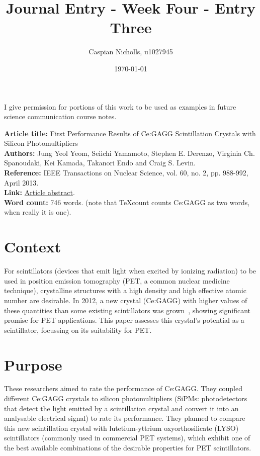 \documentclass[12pt,a4paper]{article}
\begin{document}
\title{Journal Entry - Week Four - Entry Three}
\author{Caspian Nicholls, u1027945}
\date{\today}

\maketitle

\noindent
I give permission for portions of this work to be used as examples in future science communication course notes.

\medskip
\noindent
\textbf{Article title:} First Performance Results of Ce:GAGG Scintillation Crystals with Silicon Photomultipliers \\
\textbf{Authors:} Jung Yeol Yeom, Seiichi Yamamoto, Stephen E. Derenzo, Virginia Ch. Spanoudaki, Kei Kamada, Takanori Endo and Craig S. Levin. \\
\textbf{Reference:} IEEE Transactions on Nuclear Science, vol. 60, no. 2, pp. 988-992, April 2013.\\
\textbf{Link:}  \href{https://ieeexplore.ieee.org/document/6428666}{Article abstract}. \\
\textbf{Word count:} 746 words. (note that TeXcount counts Ce:GAGG as two words, when really it is one).

\section*{Context}

For scintillators (devices that emit light when excited by ionizing radiation) to be used in position emission tomography (PET, a common nuclear medicine technique), crystalline structures with a high density and high effective atomic number are desirable.
In 2012, a new crystal (Ce:GAGG) with higher values of these quantities than some existing scintillators was grown~\cite{kamada_2inch_2012}, showing significant promise for PET applications.
This paper assesses this crystal's potential as a scintillator, focussing on its suitability for PET.

\section*{Purpose}
These researchers aimed to rate the performance of Ce:GAGG. They coupled different Ce:GAGG crystals to silicon photomultipliers (SiPMs: photodetectors that detect the light emitted by a scintillation crystal and convert it into an analysable electrical signal) to rate its performance. They planned to compare this new scintillation crystal with lutetium-yttrium oxyorthosilicate (LYSO) scintillators (commonly used in commercial PET systems), which exhibit one of the best available combinations of the desirable properties for PET scintillators.
\end{document}
